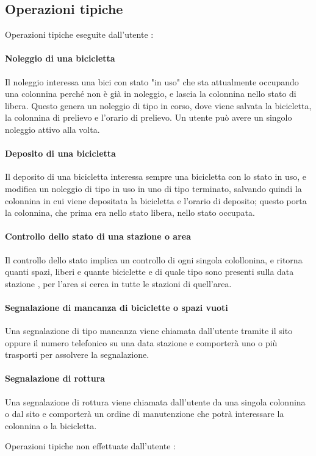 \documentclass[a4paper,twoside]{article}
\begin{document}
\subsection{Operazioni tipiche}
Operazioni tipiche eseguite dall'utente :
\paragraph{Noleggio di una bicicletta} Il noleggio interessa una bici con stato "in uso" che sta attualmente occupando una colonnina perché non è già in noleggio, e lascia la colonnina nello stato di libera. Questo genera un noleggio di tipo in corso, dove viene salvata la bicicletta, la colonnina di prelievo e l'orario di prelievo. Un utente può avere un singolo noleggio attivo alla volta.
\paragraph{Deposito di una bicicletta} Il deposito di una bicicletta interessa sempre una bicicletta con lo stato in uso, e modifica un noleggio di tipo in uso in uno di tipo terminato, salvando quindi la colonnina in cui viene depositata la bicicletta e l'orario di deposito; questo porta la colonnina, che prima era nello stato libera, nello stato occupata.
\paragraph{Controllo dello stato di una stazione o area} Il controllo dello stato implica un controllo di ogni singola colollonina, e ritorna quanti spazi, liberi e quante biciclette e di quale tipo sono presenti sulla data stazione , per l'area si cerca in tutte le stazioni di quell'area.
\paragraph{Segnalazione di mancanza di biciclette o spazi vuoti} Una segnalazione di tipo mancanza viene chiamata dall'utente tramite il sito oppure il numero telefonico su una data stazione e comporterà uno o più trasporti per assolvere la segnalazione.
\paragraph{Segnalazione di rottura} Una segnalazione di rottura viene chiamata dall'utente da una singola colonnina o dal sito e comporterà un ordine di manutenzione che potrà interessare la colonnina o la bicicletta.
\par Operazioni tipiche non effettuate dall'utente :
\end{document}
